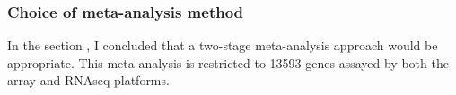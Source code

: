 \subsubsection{Choice of  meta-analysis method}
\label{subsubsec:hird_dge_meta_methodChoice}

In the section , I concluded that a two-stage meta-analysis approach would be appropriate.
This meta-analysis is restricted to 13593 genes assayed by both the array and \gls{RNAseq} platforms.
%
%
%
%
%
%
%
